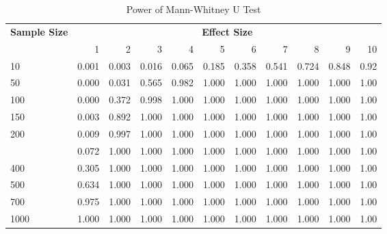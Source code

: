 \documentclass[]{article}
\begin{document}
\begin{table}

\caption{\label{tab:power-tables}Power of Mann-Whitney U Test}
\centering
\begin{tabular}[t]{lrrrrrrrrrr}
\toprule
\multicolumn{ 1}{c}{\bfseries Sample Size} & \multicolumn{10}{c}{\bfseries Effect Size} \\
\cmidrule(l{2pt}r{2pt}){1-1} \cmidrule(l{2pt}r{2pt}){2-11}
  & 1 & 2 & 3 & 4 & 5 & 6 & 7 & 8 & 9 & 10\\
\midrule
10 & 0.001 & 0.003 & 0.016 & 0.065 & 0.185 & 0.358 & 0.541 & 0.724 & 0.848 & 0.92\\
50 & 0.000 & 0.031 & 0.565 & 0.982 & 1.000 & 1.000 & 1.000 & 1.000 & 1.000 & 1.00\\
100 & 0.000 & 0.372 & 0.998 & 1.000 & 1.000 & 1.000 & 1.000 & 1.000 & 1.000 & 1.00\\
150 & 0.003 & 0.892 & 1.000 & 1.000 & 1.000 & 1.000 & 1.000 & 1.000 & 1.000 & 1.00\\
200 & 0.009 & 0.997 & 1.000 & 1.000 & 1.000 & 1.000 & 1.000 & 1.000 & 1.000 & 1.00\\
\addlinespace
300 & 0.072 & 1.000 & 1.000 & 1.000 & 1.000 & 1.000 & 1.000 & 1.000 & 1.000 & 1.00\\
400 & 0.305 & 1.000 & 1.000 & 1.000 & 1.000 & 1.000 & 1.000 & 1.000 & 1.000 & 1.00\\
500 & 0.634 & 1.000 & 1.000 & 1.000 & 1.000 & 1.000 & 1.000 & 1.000 & 1.000 & 1.00\\
700 & 0.975 & 1.000 & 1.000 & 1.000 & 1.000 & 1.000 & 1.000 & 1.000 & 1.000 & 1.00\\
1000 & 1.000 & 1.000 & 1.000 & 1.000 & 1.000 & 1.000 & 1.000 & 1.000 & 1.000 & 1.00\\
\bottomrule
\end{tabular}
\end{table}
\end{document}

